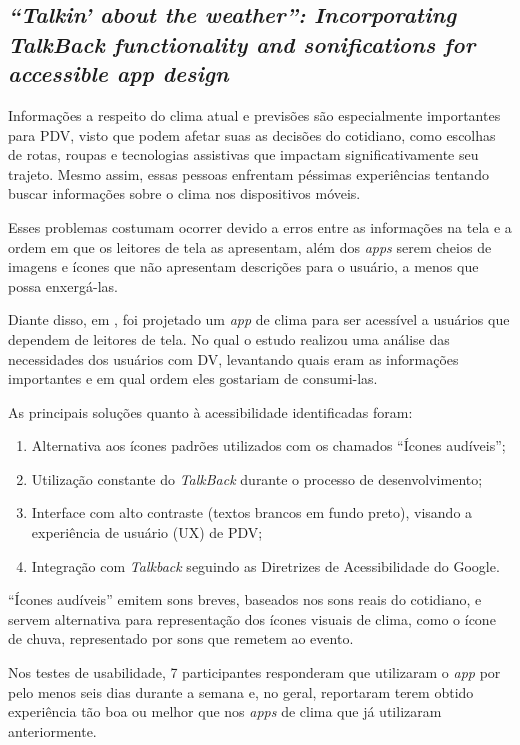 \subsection{\emph{``Talkin' about the weather'': Incorporating TalkBack functionality and sonifications for accessible app design}}

Informações a respeito do clima atual e previsões são especialmente importantes para PDV, visto que podem afetar suas as decisões
do cotidiano, como escolhas de rotas, roupas e tecnologias assistivas que impactam significativamente seu trajeto.
Mesmo assim, essas pessoas enfrentam péssimas experiências tentando buscar informações sobre o clima nos dispositivos móveis.

Esses problemas costumam ocorrer devido a erros entre as informações na tela e a ordem em que os leitores de tela as apresentam, além dos
\emph{apps} serem cheios de imagens e ícones que não apresentam descrições para o usuário, a menos que possa enxergá-las.

Diante disso, em , foi projetado um \emph{app} de clima para ser acessível a usuários que dependem
de leitores de tela. No qual o estudo realizou uma análise das necessidades dos usuários com DV, levantando quais eram as informações
importantes e em qual ordem eles gostariam de consumi-las.

As principais soluções quanto à acessibilidade identificadas foram:

\begin{enumerate}
  \item Alternativa aos ícones padrões utilizados com os chamados ``Ícones audíveis'';
  \item Utilização constante do \emph{TalkBack} durante o processo de desenvolvimento;
  \item Interface com alto contraste (textos brancos em fundo preto), visando a experiência de usuário (UX) de PDV\@;
  \item Integração com \emph{Talkback} seguindo as Diretrizes de Acessibilidade do Google.
\end{enumerate}

``Ícones audíveis'' emitem sons breves, baseados nos sons reais do cotidiano, e servem alternativa para representação dos ícones
visuais de clima, como o ícone de chuva, representado por sons que remetem ao evento.

Nos testes de usabilidade, 7 participantes responderam que utilizaram o \emph{app} por pelo menos seis dias durante a semana
e, no geral, reportaram terem obtido experiência tão boa ou melhor que nos \emph{apps} de clima que já utilizaram anteriormente.

